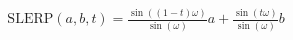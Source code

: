 \documentclass[preview]{standalone}
\begin{document}
\begin{align*}
\text{SLERP}(a, b, t) = \frac{\sin((1-t)\omega)}{\sin(\omega)} a + \frac{\sin(t\omega)}{\sin(\omega)} b
\end{align*}
\end{document}
